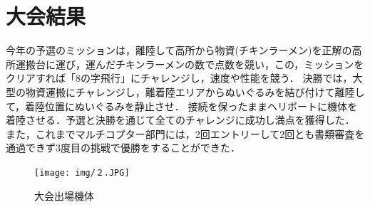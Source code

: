 \section{大会結果}
今年の予選のミッションは，離陸して高所から物資(チキンラーメン)を正解の高所運搬台に運び，運んだチキンラーメンの数で点数を競い，この，ミッションをクリアすれば「8の字飛行」にチャレンジし，速度や性能を競う．
決勝では，大型の物資運搬にチャレンジし，離着陸エリアからぬいぐるみを結び付けて離陸して，着陸位置にぬいぐるみを静止させ．
接続を保ったままヘリポートに機体を着陸させる．予選と決勝を通じて全てのチャレンジに成功し満点を獲得した．
また，これまでマルチコプター部門には，2回エントリーして2回とも書類審査を通過できず3度目の挑戦で優勝をすることができた．

\begin{figure}[htbp]
  \begin{center}
    \texttt{[image: img/２.JPG]}
    \end{center}
  \caption{大会出場機体}
 \label{fig:robot}
\end{figure}